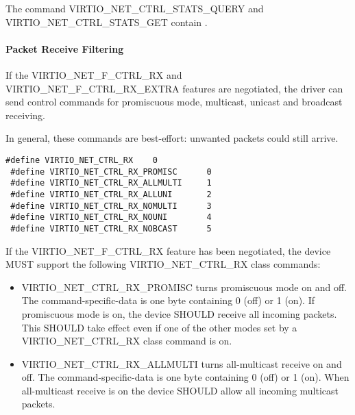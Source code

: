 The command VIRTIO_NET_CTRL_STATS_QUERY and VIRTIO_NET_CTRL_STATS_GET contain
.

\paragraph{Packet Receive Filtering}\label{sec:Device Types / Network Device / Device Operation / Control Virtqueue / Packet Receive Filtering}
\label{sec:Device Types / Network Device / Device Operation / Control Virtqueue / Setting Promiscuous Mode}%

If the VIRTIO_NET_F_CTRL_RX and VIRTIO_NET_F_CTRL_RX_EXTRA
features are negotiated, the driver can send control commands for
promiscuous mode, multicast, unicast and broadcast receiving.

\begin{note}
In general, these commands are best-effort: unwanted
packets could still arrive.
\end{note}

\begin{lstlisting}
#define VIRTIO_NET_CTRL_RX    0
 #define VIRTIO_NET_CTRL_RX_PROMISC      0
 #define VIRTIO_NET_CTRL_RX_ALLMULTI     1
 #define VIRTIO_NET_CTRL_RX_ALLUNI       2
 #define VIRTIO_NET_CTRL_RX_NOMULTI      3
 #define VIRTIO_NET_CTRL_RX_NOUNI        4
 #define VIRTIO_NET_CTRL_RX_NOBCAST      5
\end{lstlisting}



If the VIRTIO_NET_F_CTRL_RX feature has been negotiated,
the device MUST support the following VIRTIO_NET_CTRL_RX class
commands:
\begin{itemize}
\item VIRTIO_NET_CTRL_RX_PROMISC turns promiscuous mode on and
off. The command-specific-data is one byte containing 0 (off) or
1 (on). If promiscuous mode is on, the device SHOULD receive all
incoming packets.
This SHOULD take effect even if one of the other modes set by
a VIRTIO_NET_CTRL_RX class command is on.
\item VIRTIO_NET_CTRL_RX_ALLMULTI turns all-multicast receive on and
off. The command-specific-data is one byte containing 0 (off) or
1 (on). When all-multicast receive is on the device SHOULD allow
all incoming multicast packets.
\end{itemize}

